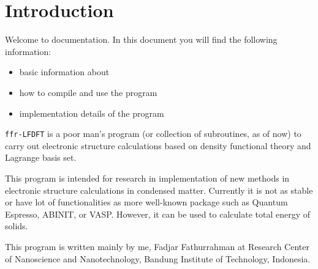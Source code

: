 \section{Introduction}

Welcome to \ffrLFDFT documentation.
In this document you will find the following information:
\begin{itemize}
\item basic information about \ffrLFDFT
\item how to compile and use the program
\item implementation details of the program
\end{itemize}

{\tt ffr-LFDFT} is a poor man's program (or collection of subroutines, as of now)
to carry out electronic structure calculations based on density functional theory
and Lagrange basis set.

This program is intended for research in implementation of new methods in
electronic structure calculations in condensed matter.
Currently it is not as stable or have lot of functionalities
as more well-known package such as Quantum Espresso, ABINIT, or VASP.
However, it can be used to calculate total energy of solids.

This program is written mainly by me, Fadjar Fathurrahman at Research Center
of Nanoscience and Nanotechnology, Bandung Institute of Technology, Indonesia.


